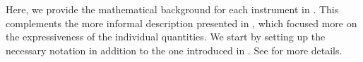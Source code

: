 Here, we provide the mathematical background for each instrument in
. This complements the more informal
description presented in , which focused more on
the expressiveness of the individual quantities. We start by setting up the
necessary notation in addition to the one introduced in
. See
for more details.

